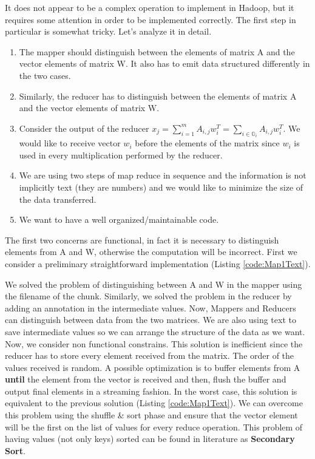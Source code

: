\documentclass[a4paper,12pt]{article}
\begin{document}
It does not appear to be a complex operation to implement in Hadoop, but it requires some attention in order to be implemented correctly.
The first step in particular is somewhat tricky. 
Let's analyze it in detail.
\begin{enumerate}
\item The mapper should distinguish between the elements of matrix A and the vector elements of matrix W. 
It also has to emit data structured differently in the two cases.
\item Similarly, the reducer has to distinguish between the elements  of matrix A and the vector elements of matrix W.
\item Consider the output of the reducer $ x_j = \sum_{i=1}^{m} A_{i,j} w_{i}^{T} = \sum_{i \in \mathbb{O}_i} A_{i,j} w_{i}^{T}$.
 We would like to receive vector $w_i$ before the elements of the matrix since $w_i$ is used in every multiplication performed by the reducer.
\item We are using two steps of map reduce in sequence and the information is not implicitly text (they are numbers) and we would like to minimize the size of the data transferred.
\item We want to have a well organized/maintainable code.
\end{enumerate}

\FloatBarrier
The first two concerns are functional, in fact it is necessary to distinguish elements from A and W, otherwise the computation will be incorrect.
First we consider a preliminary straightforward implementation (Listing \ref{code:Map1Text}).

We solved the problem of distinguishing between A and W in the mapper using the filename of the chunk. 
Similarly, we solved the problem in the reducer by adding an annotation in the intermediate values. 
Now, Mappers and Reducers can distinguish between data from the two matrices.
We are also using text to save intermediate values so we can arrange the structure of the data as we want.
Now, we consider non functional constrains.
This solution is inefficient since the reducer has to store every element received from the matrix. 
The order of the values received is random.
A possible optimization is to buffer elements from A \textbf{until} the element from the vector is received and then, flush the buffer and output final elements in a streaming fashion.
In the worst case, this solution is equivalent to the previous solution (Listing \ref{code:Map1Text}).
We can overcome this problem using the shuffle \& sort phase and ensure that the vector element will be the first on the list of values for every reduce operation.
This problem of having values (not only keys) sorted can be found in literature as \textbf{Secondary Sort}.
\end{document}
